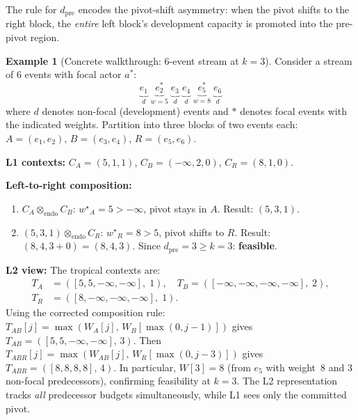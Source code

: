\documentclass[11pt]{article}
\theoremstyle{plain}
\theoremstyle{definition}
\newtheorem{example}[theorem]{Example}
\theoremstyle{remark}
\newcommand{\opendo}{\otimes_{\mathrm{endo}}}
\newcommand{\wstar}{{w^{\star}}}
\newcommand{\dpre}[1][]{d_{\mathrm{pre}#1}}
\begin{document}
The rule for $\dpre$ encodes the pivot-shift asymmetry: when the pivot
shifts to the right block, the \emph{entire} left block's development
capacity is promoted into the pre-pivot region.

\begin{example}[Concrete walkthrough: 6-event stream at $k = 3$]
\label{ex:walkthrough}
Consider a stream of 6 events with focal actor $a^*$:
\[
  \underbrace{e_1^{\phantom{*}}}_{d} \;
  \underbrace{e_2^*}_{w=5} \;
  \underbrace{e_3^{\phantom{*}}}_{d} \;
  \underbrace{e_4^{\phantom{*}}}_{d} \;
  \underbrace{e_5^*}_{w=8} \;
  \underbrace{e_6^{\phantom{*}}}_{d}
\]
where $d$ denotes non-focal (development) events and $*$ denotes focal
events with the indicated weights.  Partition into three blocks of two
events each: $A = (e_1, e_2)$, $B = (e_3, e_4)$, $R = (e_5, e_6)$.

\medskip\noindent
\textbf{L1 contexts:}
$C_A = (5, 1, 1)$, $C_B = (-\infty, 2, 0)$, $C_R = (8, 1, 0)$.

\medskip\noindent
\textbf{Left-to-right composition:}
\begin{enumerate}[nosep]
  \item $C_A \opendo C_B$: $\wstar_A = 5 > -\infty$, pivot stays in
    $A$.  Result: $(5, 3, 1)$.
  \item $(5, 3, 1) \opendo C_R$: $\wstar_R = 8 > 5$, pivot shifts to
    $R$.  Result: $(8, 4, 3 + 0) = (8, 4, 3)$.  Since $\dpre = 3 \ge
    k = 3$: \textbf{feasible}.
\end{enumerate}

\medskip\noindent
\textbf{L2 view:}  The tropical contexts are:
\begin{align*}
  T_A &= ([5, 5, -\infty, -\infty],\; 1), \quad
  T_B = ([-\infty, -\infty, -\infty, -\infty],\; 2),\\
  T_R &= ([8, -\infty, -\infty, -\infty],\; 1).
\end{align*}
Using the corrected composition rule:
$T_{AB}[j] = \max(W_A[j],\, W_B[\max(0, j{-}1)])$ gives
$T_{AB} = ([5, 5, -\infty, -\infty],\, 3)$.  Then
$T_{ABR}[j] = \max(W_{AB}[j],\, W_R[\max(0, j{-}3)])$ gives
$T_{ABR} = ([8, 8, 8, 8],\, 4)$.
In particular, $W[3] = 8$ (from $e_5$ with weight~$8$ and $3$
non-focal predecessors), confirming feasibility at $k = 3$.  The L2
representation tracks \emph{all} predecessor budgets simultaneously,
while L1 sees only the committed pivot.
\end{example}
\end{document}
